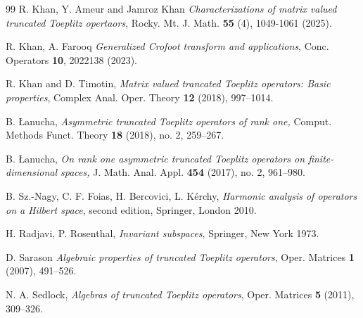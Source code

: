 \documentclass[12pt]{amsart}
\numberwithin{equation}{section}
\theoremstyle{definition}
\numberwithin{equation}{section}
\begin{document}
\begin{thebibliography}{99}
R. Khan, Y. Ameur and Jamroz Khan \textit{Characterizations of matrix valued truncated Toeplitz opertaors}, Rocky. Mt. J. Math. {\bf 55} (4), 1049-1061 (2025).

R. Khan, A. Farooq  \textit{ Generalized Crofoot transform and applications}, Conc. Operators {\bf10}, 2022138 (2023).

{R. Khan and D. Timotin}, \textit{Matrix valued trancated Toeplitz operators: Basic properties},
Complex Anal. Oper. Theory {\bf 12} (2018), 997--1014.

B. \L anucha, \textit{Asymmetric truncated Toeplitz operators of rank one,} Comput. Methods Funct. Theory \textbf{18} (2018), no. 2, 259--267.

B. \L anucha, \textit{On rank one asymmetric truncated Toeplitz operators on finite-dimensional spaces,} J. Math. Anal. Appl. \textbf{454} (2017), no. 2, 961--980.

{B. Sz.-Nagy, C. F. Foias, H. Bercovici, L. K\'{e}rchy},
\textit{Harmonic analysis of operators on a Hilbert space}, second edition,  Springer, London 2010.

{H. Radjavi, P. Rosenthal}, \textit{Invariant subspaces},
Springer, New York 1973.

{D. Sarason}
\textit{Algebraic properties of truncated Toeplitz operators}, Oper. Matrices {\bf 1} (2007), 491--526.


N. A. Sedlock, \textit{Algebras of truncated Toeplitz operators}, Oper. Matrices {\bf 5} (2011), 309--326.

\end{thebibliography}
\end{document}
